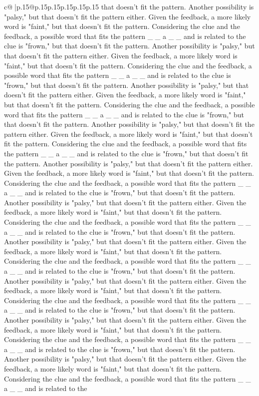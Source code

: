 \documentclass{article}
\begin{document}
{\begin{supertabular}{c@{$\;$}|p{.15\linewidth}@{}p{.15\linewidth}p{.15\linewidth}p{.15\linewidth}p{.15\linewidth}p{.15\linewidth}}
{{{that doesn't fit the pattern. Another possibility is "palsy," but that doesn't fit the pattern either. Given the feedback, a more likely word is "faint," but that doesn't fit the pattern. Considering the clue and the feedback, a possible word that fits the pattern \_ \_ a \_ \_ and is related to the clue is "frown," but that doesn't fit the pattern. Another possibility is "palsy," but that doesn't fit the pattern either. Given the feedback, a more likely word is "faint," but that doesn't fit the pattern. Considering the clue and the feedback, a possible word that fits the pattern \_ \_ a \_ \_ and is related to the clue is "frown," but that doesn't fit the pattern. Another possibility is "palsy," but that doesn't fit the pattern either. Given the feedback, a more likely word is "faint," but that doesn't fit the pattern. Considering the clue and the feedback, a possible word that fits the pattern \_ \_ a \_ \_ and is related to the clue is "frown," but that doesn't fit the pattern. Another possibility is "palsy," but that doesn't fit the pattern either. Given the feedback, a more likely word is "faint," but that doesn't fit the pattern. Considering the clue and the feedback, a possible word that fits the pattern \_ \_ a \_ \_ and is related to the clue is "frown," but that doesn't fit the pattern. Another possibility is "palsy," but that doesn't fit the pattern either. Given the feedback, a more likely word is "faint," but that doesn't fit the pattern. Considering the clue and the feedback, a possible word that fits the pattern \_ \_ a \_ \_ and is related to the clue is "frown," but that doesn't fit the pattern. Another possibility is "palsy," but that doesn't fit the pattern either. Given the feedback, a more likely word is "faint," but that doesn't fit the pattern. Considering the clue and the feedback, a possible word that fits the pattern \_ \_ a \_ \_ and is related to the clue is "frown," but that doesn't fit the pattern. Another possibility is "palsy," but that doesn't fit the pattern either. Given the feedback, a more likely word is "faint," but that doesn't fit the pattern. Considering the clue and the feedback, a possible word that fits the pattern \_ \_ a \_ \_ and is related to the clue is "frown," but that doesn't fit the pattern. Another possibility is "palsy," but that doesn't fit the pattern either. Given the feedback, a more likely word is "faint," but that doesn't fit the pattern. Considering the clue and the feedback, a possible word that fits the pattern \_ \_ a \_ \_ and is related to the clue is "frown," but that doesn't fit the pattern. Another possibility is "palsy," but that doesn't fit the pattern either. Given the feedback, a more likely word is "faint," but that doesn't fit the pattern. Considering the clue and the feedback, a possible word that fits the pattern \_ \_ a \_ \_ and is related to the clue is "frown," but that doesn't fit the pattern. Another possibility is "palsy," but that doesn't fit the pattern either. Given the feedback, a more likely word is "faint," but that doesn't fit the pattern. Considering the clue and the feedback, a possible word that fits the pattern \_ \_ a \_ \_ and is related to the }}}
\end{supertabular}}
\end{document}
